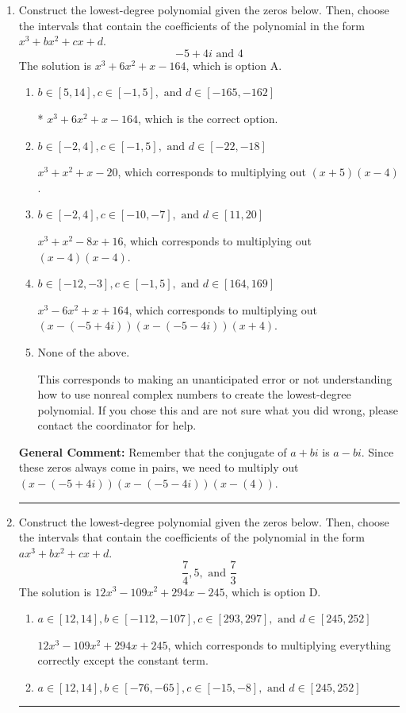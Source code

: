 \documentclass{extbook}[14pt]
\newcommand{\litem}[1]{\item #1

\rule{\textwidth}{0.4pt}}
\begin{document}
\begin{enumerate}\litem{
Construct the lowest-degree polynomial given the zeros below. Then, choose the intervals that contain the coefficients of the polynomial in the form $x^3+bx^2+cx+d$.
\[ -5 + 4 i \text{ and } 4 \]The solution is \( x^{3} +6 x^{2} +x -164 \), which is option A.\begin{enumerate}[label=\Alph*.]
\item \( b \in [5, 14], c \in [-1, 5], \text{ and } d \in [-165, -162] \)

* $x^{3} +6 x^{2} +x -164$, which is the correct option.
\item \( b \in [-2, 4], c \in [-1, 5], \text{ and } d \in [-22, -18] \)

$x^{3} + x^{2} +x -20$, which corresponds to multiplying out $(x + 5)(x -4)$.
\item \( b \in [-2, 4], c \in [-10, -7], \text{ and } d \in [11, 20] \)

$x^{3} + x^{2} -8 x + 16$, which corresponds to multiplying out $(x -4)(x -4)$.
\item \( b \in [-12, -3], c \in [-1, 5], \text{ and } d \in [164, 169] \)

$x^{3} -6 x^{2} +x + 164$, which corresponds to multiplying out $(x-(-5 + 4 i))(x-(-5 - 4 i))(x + 4)$.
\item \( \text{None of the above.} \)

This corresponds to making an unanticipated error or not understanding how to use nonreal complex numbers to create the lowest-degree polynomial. If you chose this and are not sure what you did wrong, please contact the coordinator for help.
\end{enumerate}

\textbf{General Comment:} Remember that the conjugate of $a+bi$ is $a-bi$. Since these zeros always come in pairs, we need to multiply out $(x-(-5 + 4 i))(x-(-5 - 4 i))(x-(4))$.
}
\litem{
Construct the lowest-degree polynomial given the zeros below. Then, choose the intervals that contain the coefficients of the polynomial in the form $ax^3+bx^2+cx+d$.
\[ \frac{7}{4}, 5, \text{ and } \frac{7}{3} \]The solution is \( 12x^{3} -109 x^{2} +294 x -245 \), which is option D.\begin{enumerate}[label=\Alph*.]
\item \( a \in [12, 14], b \in [-112, -107], c \in [293, 297], \text{ and } d \in [245, 252] \)

$12x^{3} -109 x^{2} +294 x + 245$, which corresponds to multiplying everything correctly except the constant term.
\item \( a \in [12, 14], b \in [-76, -65], c \in [-15, -8], \text{ and } d \in [245, 252] \)


\end{enumerate}}
\end{enumerate}
\end{document}
